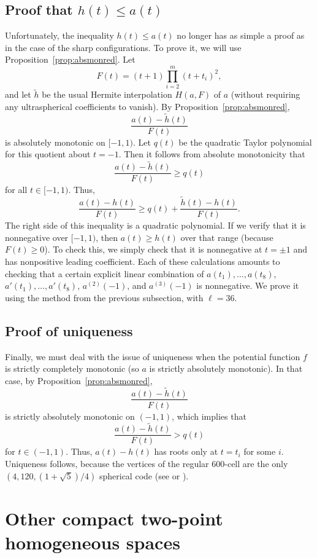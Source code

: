 \documentclass{jams-l}
\theoremstyle{plain}
\numberwithin{theorem}{section}
\theoremstyle{definition}
\numberwithin{equation}{section}
\begin{document}
\subsection{Proof that $h(t) \le a(t)$}

Unfortunately, the inequality $h(t) \le a(t)$ no longer has as
simple a proof as in the case of the sharp configurations.  To
prove it, we will use Proposition~\ref{prop:absmonred}.  Let
$$
F(t) = (t+1)\prod_{i=2}^m (t+t_i)^2,
$$
and let $\tilde{h}$ be the usual Hermite interpolation $H(a,F)$ of
$a$ (without requiring any ultraspherical coefficients to vanish).
By Proposition~\ref{prop:absmonred},
$$
\frac{a(t) - \tilde{h}(t)}{F(t)}
$$
is absolutely monotonic on $[-1,1)$.  Let $q(t)$ be the quadratic
Taylor polynomial for this quotient about $t=-1$.  Then it follows
from absolute monotonicity that
$$
\frac{a(t) - \tilde{h}(t)}{F(t)} \ge q(t)
$$
for all $t \in [-1,1)$.  Thus,
$$
\frac{a(t) - h(t)}{F(t)} \ge q(t) +
\frac{\tilde{h}(t)-h(t)}{F(t)}.
$$
The right side of this inequality is a quadratic polynomial.  If
we verify that it is nonnegative over $[-1,1)$, then $a(t) \ge
h(t)$ over that range (because $F(t) \ge 0$).  To check this, we
simply check that it is nonnegative at $t= \pm 1$ and has
nonpositive leading coefficient. Each of these calculations
amounts to checking that a certain explicit linear combination of
$a(t_1),\dots,a(t_8)$, $a'(t_1),\dots,a'(t_8)$, $a^{(2)}(-1)$, and
$a^{(3)}(-1)$ is nonnegative.  We prove it using the method from
the previous subsection, with $\ell=36$.

\subsection{Proof of uniqueness}

Finally, we must deal with the issue of uniqueness when the
potential function $f$ is strictly completely monotonic (so $a$ is
strictly absolutely monotonic).  In that case, by
Proposition~\ref{prop:absmonred},
$$
\frac{a(t) - \tilde{h}(t)}{F(t)}
$$
is strictly absolutely monotonic on $(-1,1)$, which implies that
$$
\frac{a(t) - \tilde{h}(t)}{F(t)} > q(t)
$$
for $t \in (-1,1)$.  Thus, $a(t)-h(t)$ has roots only at $t=t_i$
for some $i$. Uniqueness follows, because the vertices of the
regular $600$-cell are the only $(4,120,(1+\sqrt{5})/4)$ spherical
code (see \cite[p.~260]{B} or \cite{BD}).

\section{Other compact two-point homogeneous spaces}
\label{sec:otherhomog}
\end{document}
